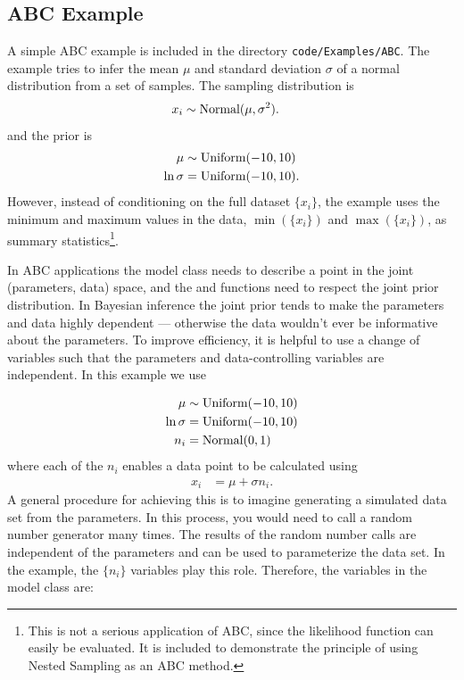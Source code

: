 \documentclass[article, nojss]{jss}
\begin{document}
\subsection{ABC Example}
A simple ABC example is included in the directory
{\tt code/Examples/ABC}. The example tries to infer the mean
$\mu$ and standard deviation $\sigma$ of a normal distribution
from a set of samples. The sampling distribution is
\begin{align}
x_i &\sim \textnormal{Normal}(\mu, \sigma^2).
\end{align}
and the prior is
\begin{align}
\mu &\sim \textnormal{Uniform}(-10, 10)\\
\ln\sigma &= \textnormal{Uniform}(-10, 10).
\end{align}
However, instead of conditioning on the full dataset $\{x_i\}$, the example
uses the minimum and maximum values in the data,
$\min(\{x_i\})$ and $\max(\{x_i\})$, as summary statistics\footnote{This is
not a serious application of ABC, since the likelihood function can easily
be evaluated. It is included to demonstrate the principle of using
Nested Sampling as an ABC method.}.

In ABC applications the model class needs to describe a point in the joint
(parameters, data) space, and the  and 
functions need to respect the joint prior distribution.
In Bayesian inference the joint prior tends to make the
parameters and data highly dependent
--- otherwise the data wouldn't ever be informative about the parameters.
To improve efficiency, it is helpful to use a change of variables such that
the parameters and data-controlling variables are independent. In this
example we use

\begin{align}
\mu &\sim \textnormal{Uniform}(-10, 10)\\
\ln\sigma &= \textnormal{Uniform}(-10, 10)\\
n_i &= \textnormal{Normal}(0, 1)
\end{align}
where each of the $n_i$ enables a data point to be calculated using
\begin{align}
x_i &= \mu + \sigma n_i.
\end{align}
A general procedure for achieving this is to imagine generating a
simulated data set from the parameters. In this process, you would need
to call a random number generator many times.
The results of the random number calls
are independent of the parameters and
can be used to parameterize the data set. In the example,
the $\{n_i\}$ variables play this role.
Therefore, the variables in the model class are:
\begin{CodeChunk}
\begin{CodeInput}
class MyModel
{
    private:
        double mu, log_sigma;
        std::vector<double> n;
\end{CodeInput}
\end{CodeChunk}
\end{document}
